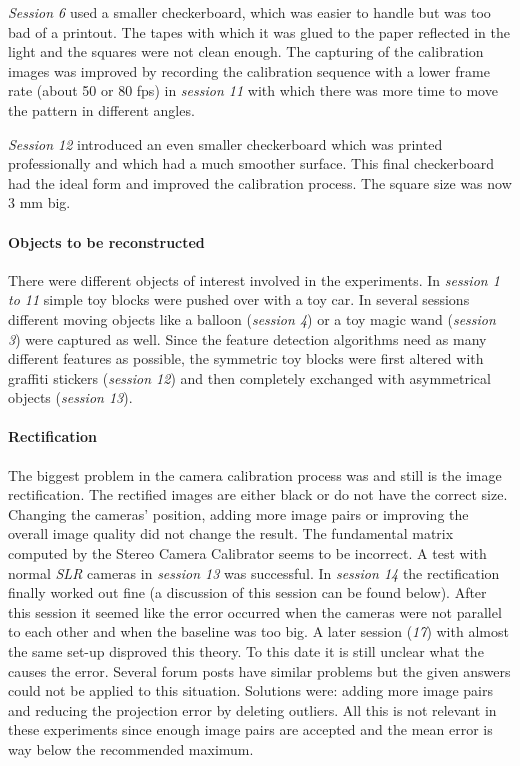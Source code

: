 \textit{Session 6} used a smaller checkerboard, which was easier to handle but was too bad of a printout. The tapes with which it was glued to the paper reflected in the light and the squares were not clean enough. The capturing of the calibration images was improved by recording the calibration sequence with a lower frame rate (about 50 or 80 fps) in \textit{session 11} with which there was more time to move the pattern in different angles.

\textit{Session 12} introduced an even smaller checkerboard which was printed professionally and which had a much smoother surface. This final checkerboard had the ideal form and improved the calibration process. The square size was now 3 mm big.

\paragraph{Objects to be reconstructed}
There were different objects of interest involved in the experiments. In \textit{session 1 to 11} simple toy blocks were pushed over with a toy car. In several sessions different moving objects like a balloon (\textit{session 4}) or a toy magic wand (\textit{session 3}) were captured as well. Since the feature detection algorithms need as many different features as possible, the symmetric toy blocks were first altered with graffiti stickers (\textit{session 12}) and then completely exchanged with asymmetrical objects (\textit{session 13}).    

\paragraph{Rectification}
The biggest problem in the camera calibration process was and still is the image rectification. The rectified images are either black or do not have the correct size. Changing the cameras' position, adding more image pairs or improving the overall image quality did not change the result. The fundamental matrix computed by the Stereo Camera Calibrator seems to be incorrect. A test with normal \textit{SLR} cameras in \textit{session 13} was successful. In \textit{session 14} the rectification finally worked out fine (a discussion of this session can be found below). After this session it seemed like the error occurred when the cameras were not parallel to each other and when the baseline was too big. A later session (\textit{17}) with almost the same set-up disproved this theory. To this date it is still unclear what the causes the error. Several forum posts have similar problems but the given answers could not be applied to this situation. Solutions were: adding more image pairs and reducing the projection error by deleting outliers. All this is not relevant in these experiments since enough image pairs are accepted and the mean error is way below the recommended maximum.

